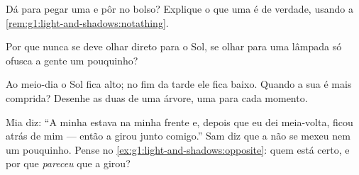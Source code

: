 \begin{exercise}[$\star$]\label{exo:g1:light-and-shadows:6}
Dá para pegar uma  e pôr no bolso? Explique o que uma  é
de verdade, usando a \cref{rem:g1:light-and-shadows:notathing}.
\end{exercise}

\begin{exercise}[$\star$]\label{exo:g1:light-and-shadows:7}
Por que nunca se deve olhar direto para o Sol, se olhar para uma
lâmpada só ofusca a gente um pouquinho?
\end{exercise}

\begin{exercise}[$\star$]\label{exo:g1:light-and-shadows:8}
Ao meio-dia o Sol fica alto; no fim da tarde ele fica baixo. Quando a
sua  é mais comprida? Desenhe as duas  de uma árvore,
uma para cada momento.
\end{exercise}

\begin{exercise}[$\star\star$]\label{exo:g1:light-and-shadows:9}
Mia diz: ``A minha  estava na minha frente e, depois que eu dei
meia-volta, ficou atrás de mim --- então a  girou junto
comigo.'' Sam diz que a  não se mexeu nem um pouquinho. Pense
no \cref{ex:g1:light-and-shadows:opposite}: quem está certo, e por
que \emph{pareceu} que a  girou?
\end{exercise}
